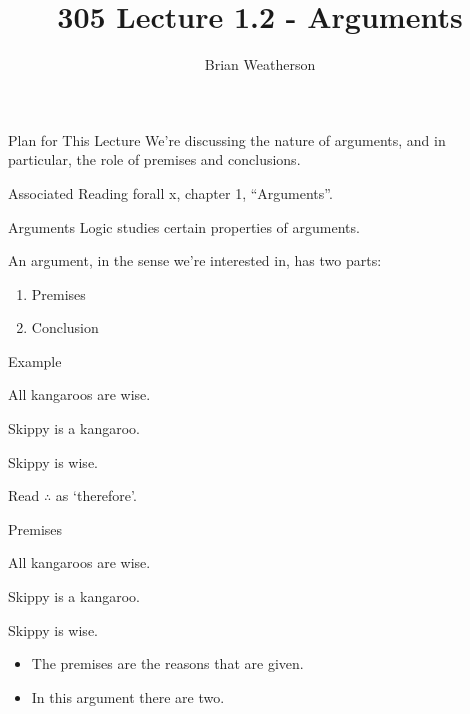 \documentclass[
  ignorenonframetext,
]{beamer}
\title{305 Lecture 1.2 - Arguments}
\author{Brian Weatherson}
\date{}
\providecommand{\tightlist}{%
  \setlength{\itemsep}{0pt}\setlength{\parskip}{0pt}}
\renewcommand{\,}{\text{, }}
\begin{document}
\frame{\titlepage}

\begin{frame}{Plan for This Lecture}
\protect\hypertarget{plan-for-this-lecture}{}
We're discussing the nature of arguments, and in particular, the role of
premises and conclusions.
\end{frame}

\begin{frame}{Associated Reading}
\protect\hypertarget{associated-reading}{}
forall x, chapter 1, ``Arguments''.
\end{frame}

\begin{frame}{Arguments}
\protect\hypertarget{arguments}{}
Logic studies certain properties of arguments.

An argument, in the sense we're interested in, has two parts:

\begin{enumerate}
\tightlist
\item
  Premises
\item
  Conclusion
\end{enumerate}
\end{frame}

\begin{frame}{Example}
\protect\hypertarget{example}{}
\begin{description}
\tightlist
\item[~]
All kangaroos are wise.
\item[~]
Skippy is a kangaroo.
\item[\(\therefore\)]
Skippy is wise.
\end{description}

Read \(\therefore\) as `therefore'.
\end{frame}

\begin{frame}{Premises}
\protect\hypertarget{premises}{}
\begin{description}
\tightlist
\item[~]
All kangaroos are wise.
\item[~]
Skippy is a kangaroo.
\item[\(\therefore\)]
Skippy is wise.
\end{description}

\begin{itemize}
\tightlist
\item
  The premises are the reasons that are given.
\item
  In this argument there are two.
\end{itemize}
\end{frame}
\end{document}
